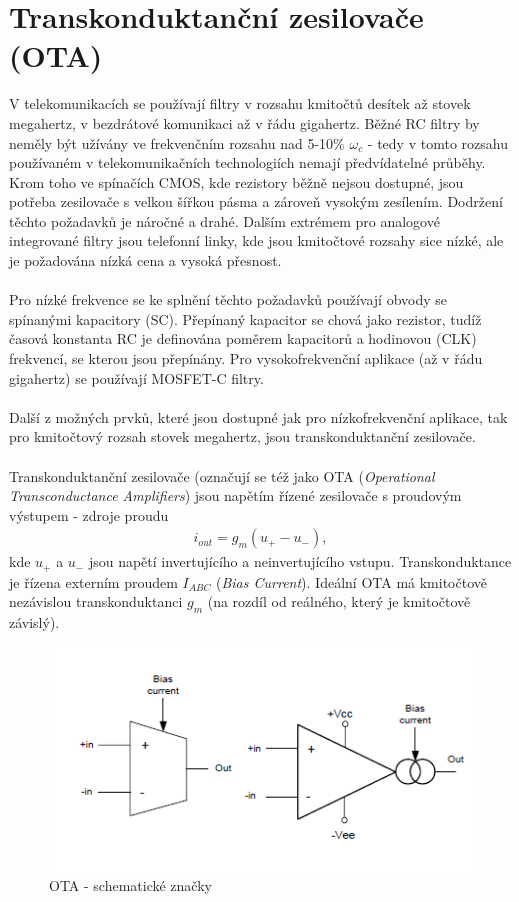 \documentclass[twoside]{article}
\begin{document}
\section{Transkonduktanční zesilovače (OTA)}
V telekomunikacích se používají filtry v rozsahu kmitočtů desítek až stovek megahertz, v bezdrátové komunikaci až v řádu gigahertz. Běžné RC filtry by neměly být užívány ve frekvenčním rozsahu nad 5-10$\%$ $\omega _c$ - tedy v tomto rozsahu používaném v telekomunikačních technologiích nemají předvídatelné průběhy. Krom toho ve spínačích CMOS, kde rezistory běžně nejsou dostupné, jsou potřeba zesilovače s velkou šířkou pásma a zároveň vysokým zesílením. Dodržení těchto požadavků je náročné a drahé. Dalším extrémem pro analogové integrované filtry jsou telefonní linky, kde jsou kmitočtové rozsahy sice nízké, ale je požadována nízká cena a vysoká přesnost.\\
\\
Pro nízké frekvence se ke splnění těchto požadavků používají obvody se spínanými kapacitory (SC). Přepínaný kapacitor se chová jako rezistor, tudíž časová konstanta RC je definována poměrem kapacitorů a hodinovou (CLK) frekvencí, se kterou jsou přepínány. Pro vysokofrekvenční aplikace (až v řádu gigahertz) se používají MOSFET-C filtry.\\
\\
Další z možných prvků, které jsou dostupné jak pro nízkofrekvenční aplikace, tak pro kmitočtový rozsah stovek megahertz, jsou transkonduktanční zesilovače.\\\\
Transkonduktanční zesilovače (označují se též jako OTA (\textit{Operational Transconductance Amplifiers}) jsou napětím řízené zesilovače s proudovým výstupem - zdroje proudu
\begin{align}
i_{out} = g_m(u_+ - u_-),
\end{align}
kde $u_+$ a $u_-$ jsou napětí invertujícího a neinvertujícího vstupu.  Transkonduktance je řízena externím proudem $I_{ABC}$ (\textit{Bias Current}). Ideální OTA má kmitočtově nezávislou transkonduktanci $g_m$ (na rozdíl od reálného, který je kmitočtově závislý).
\begin{figure}[H]
\centering
\includegraphics[scale=0.7]{image7.png}
\caption{OTA - schematické značky \cite{3}}
\end{figure}
\end{document}

